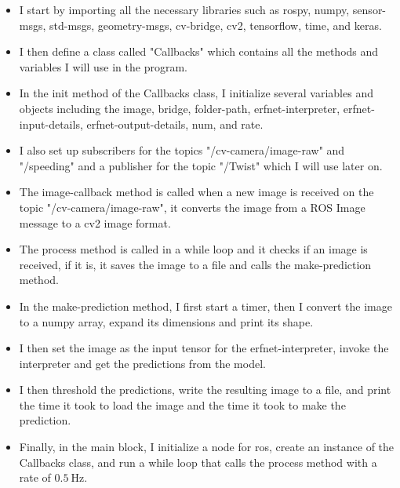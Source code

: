 \documentclass[11pt, a4paper, openany]{book}
\begin{document}
\begin{itemize}
\item I start by importing all the necessary libraries such as rospy, numpy, sensor-msgs, std-msgs, geometry-msgs, cv-bridge, cv2, tensorflow, time, and keras.
\item I then define a class called "Callbacks" which contains all the methods and variables I will use in the program.
\item In the init method of the Callbacks class, I initialize several variables and objects including the image, bridge, folder-path, erfnet-interpreter, erfnet-input-details, erfnet-output-details, num, and rate.
\item  I also set up subscribers for the topics "/cv-camera/image-raw" and "/speeding" and a publisher for the topic "/Twist" which I will use later on.
\item  The image-callback method is called when a new image is received on the topic "/cv-camera/image-raw", it converts the image from a ROS Image message to a cv2 image format.
\item  The process method is called in a while loop and it checks if an image is received, if it is, it saves the image to a file and calls the make-prediction method.
\item  In the make-prediction method, I first start a timer, then I convert the image to a numpy array, expand its dimensions and print its shape.
\item I then set the image as the input tensor for the erfnet-interpreter, invoke the interpreter and get the predictions from the model.
\item I then threshold the predictions, write the resulting image to a file, and print the time it took to load the image and the time it took to make the prediction.
\item  Finally, in the main block, I initialize a node for ros, create an instance of the Callbacks class, and run a while loop that calls the process method with a rate of $0.5 \mathrm{~Hz}$.\cite{Github}
\end{itemize}
\end{document}
